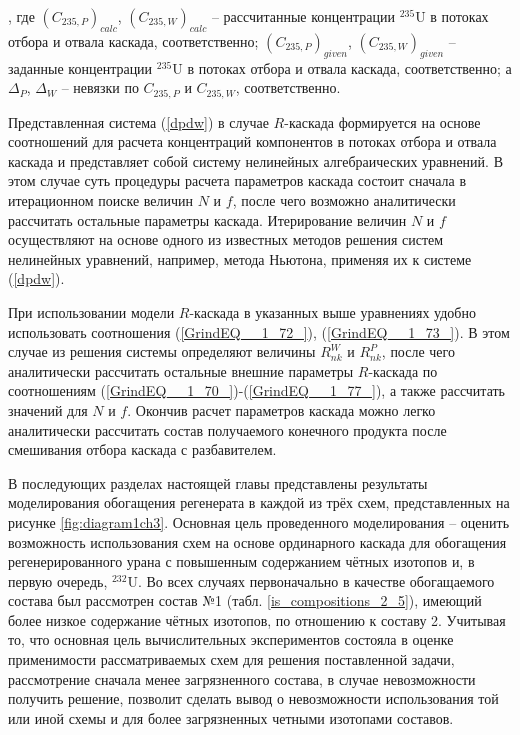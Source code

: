 , где ${(C_{235, P})}_{calc}$, ${(C_{235, W})}_{calc}$ -- рассчитанные концентрации $^{235}$U в потоках отбора и отвала каскада, соответственно; ${(C_{235, P})}_{given}$, ${(C_{235, W})}_{given}$ -- заданные концентрации $^{235}$U в потоках отбора и отвала каскада, соответственно; а $\Delta_{P}$, $\Delta_{W}$ -- невязки по $C_{235, P}$ и $C_{235, W}$, соответственно. 

Представленная система (\ref{dpdw}) в случае $R$-каскада формируется на основе соотношений для расчета концентраций компонентов в потоках отбора и отвала каскада и представляет собой систему нелинейных алгебраических уравнений. В этом случае суть процедуры расчета параметров каскада состоит сначала в итерационном поиске величин $N$ и $f$, после чего возможно аналитически рассчитать остальные параметры каскада. Итерирование величин $N$ и $f$ осуществляют на основе одного из известных методов решения систем нелинейных уравнений, например, метода Ньютона, применяя их к системе (\ref{dpdw}). 

При использовании модели $R$-каскада в указанных выше уравнениях удобно использовать соотношения (\ref{GrindEQ__1_72_}), (\ref{GrindEQ__1_73_}). В этом случае из решения системы определяют величины $R_{n k}^{W}$ и $R_{n k}^{P}$, после чего аналитически рассчитать остальные внешние параметры $R$-каскада по соотношениям (\ref{GrindEQ__1_70_})-(\ref{GrindEQ__1_77_}), а также рассчитать значений для $N$ и $f$. Окончив расчет параметров каскада можно легко аналитически рассчитать состав получаемого конечного продукта после смешивания отбора каскада с разбавителем.

В последующих разделах настоящей главы представлены результаты моделирования обогащения регенерата в каждой из трёх схем, представленных на рисунке \ref{fig:diagram1ch3}. 
Основная цель проведенного моделирования -- оценить возможность использования схем на основе ординарного каскада для обогащения регенерированного урана с повышенным содержанием чётных изотопов и, в первую очередь, $^{232}$U. Во всех случаях первоначально в качестве обогащаемого состава был рассмотрен состав №1 (табл. \ref{is_compositions_2_5}), имеющий более низкое содержание чётных изотопов, по отношению к составу 2. Учитывая то, что основная цель вычислительных экспериментов состояла в оценке применимости рассматриваемых схем для решения поставленной задачи, рассмотрение сначала менее загрязненного состава, в случае невозможности получить решение, позволит сделать вывод о невозможности использования той или иной схемы и для более загрязненных четными изотопами составов.

